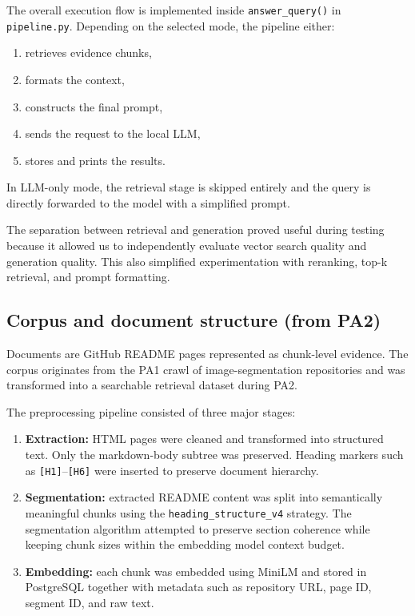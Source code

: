 \documentclass[11pt,a4paper]{article}
\begin{document}
The overall execution flow is implemented inside \texttt{answer\_query()} in \texttt{pipeline.py}. Depending on the selected mode, the pipeline either:

\begin{enumerate}
  \item retrieves evidence chunks,
  \item formats the context,
  \item constructs the final prompt,
  \item sends the request to the local LLM,
  \item stores and prints the results.
\end{enumerate}

In LLM-only mode, the retrieval stage is skipped entirely and the query is directly forwarded to the model with a simplified prompt.

The separation between retrieval and generation proved useful during testing because it allowed us to independently evaluate vector search quality and generation quality. This also simplified experimentation with reranking, top-k retrieval, and prompt formatting.

\subsection{Corpus and document structure (from PA2)}
Documents are GitHub README pages represented as chunk-level evidence. The corpus originates from the PA1 crawl of image-segmentation repositories and was transformed into a searchable retrieval dataset during PA2.

The preprocessing pipeline consisted of three major stages:

\begin{enumerate}
  \item \textbf{Extraction:} HTML pages were cleaned and transformed into structured text. Only the markdown-body subtree was preserved. Heading markers such as \texttt{[H1]}--\texttt{[H6]} were inserted to preserve document hierarchy.

  \item \textbf{Segmentation:} extracted README content was split into semantically meaningful chunks using the \texttt{heading\_structure\_v4} strategy. The segmentation algorithm attempted to preserve section coherence while keeping chunk sizes within the embedding model context budget.

  \item \textbf{Embedding:} each chunk was embedded using MiniLM and stored in PostgreSQL together with metadata such as repository URL, page ID, segment ID, and raw text.
\end{enumerate}
\end{document}
